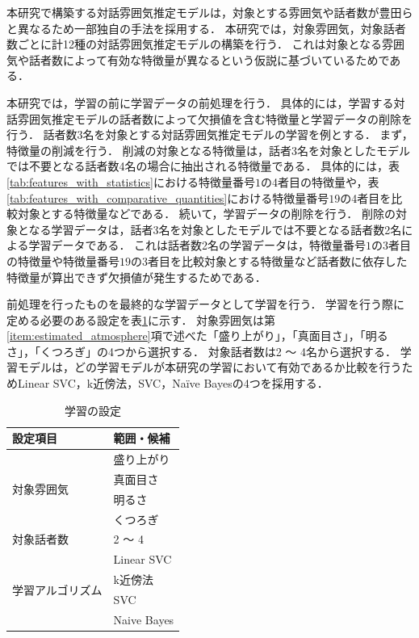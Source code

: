 本研究で構築する対話雰囲気推定モデルは，対象とする雰囲気や話者数が豊田らと異なるため一部独自の手法を採用する．
本研究では，対象雰囲気，対象話者数ごとに計12種の対話雰囲気推定モデルの構築を行う．
これは対象となる雰囲気や話者数によって有効な特徴量が異なるという仮説に基づいているためである．

本研究では，学習の前に学習データの前処理を行う．
具体的には，学習する対話雰囲気推定モデルの話者数によって欠損値を含む特徴量と学習データの削除を行う．
話者数3名を対象とする対話雰囲気推定モデルの学習を例とする．
まず，特徴量の削減を行う．
削減の対象となる特徴量は，話者3名を対象としたモデルでは不要となる話者数4名の場合に抽出される特徴量である．
具体的には，表\ref{tab:features_with_statistics}における特徴量番号$1$の4者目の特徴量や，表\ref{tab:features_with_comparative_quantities}における特徴量番号$19$の4者目を比較対象とする特徴量などである．
続いて，学習データの削除を行う．
削除の対象となる学習データは，話者3名を対象としたモデルでは不要となる話者数2名による学習データである．
これは話者数2名の学習データは，特徴量番号$1$の3者目の特徴量や特徴量番号$19$の3者目を比較対象とする特徴量など話者数に依存した特徴量が算出できず欠損値が発生するためである．

前処理を行ったものを最終的な学習データとして学習を行う．
学習を行う際に定める必要のある設定を表\ref{tab:learning_setting}に示す．
対象雰囲気は第\ref{item:estimated_atmosphere}項で述べた「盛り上がり」，「真面目さ」，「明るさ」，「くつろぎ」の4つから選択する．
対象話者数は2 〜 4名から選択する．
学習モデルは，どの学習モデルが本研究の学習において有効であるか比較を行うためLinear SVC，k近傍法，SVC，Naïve Bayesの4つを採用する．

\begin{table}[t]
    \caption{学習の設定}
    \centering
    \begin{tabular}{ll}
        \hline
        設定項目 & 範囲・候補 \\ \hline\hline
        \multirow{4}{*}{対象雰囲気} & 盛り上がり \\
        & 真面目さ \\
        & 明るさ \\
        & くつろぎ \\ \hline
        対象話者数 & 2 〜 4 \\ \hline
        \multirow{4}{*}{学習アルゴリズム} & Linear SVC \\
        & k近傍法 \\
        & SVC \\
        & Naive Bayes \\ \hline
    \end{tabular}
    \label{tab:learning_setting}
\end{table}

